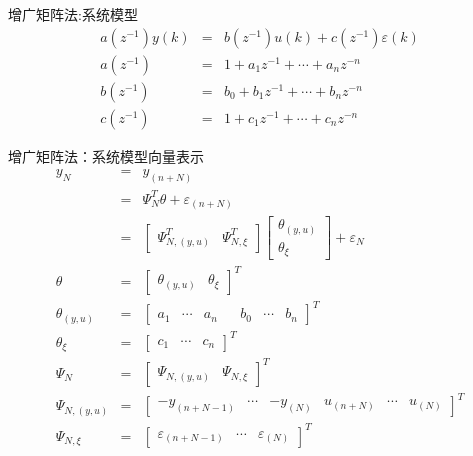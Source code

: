 \begin{frame}{增广矩阵法:系统模型}
\begin{eqnarray*}
a(z^{-1})y(k) &=& b(z^{-1})u(k)+c(z^{-1})\varepsilon(k) \\
a(z^{-1}) &=& 1 + a_1 z^{-1} + \cdots + a_n z^{-n} \\
b(z^{-1}) &=& b_0 + b_1 z^{-1} + \cdots + b_n z^{-n} \\
c(z^{-1}) &=& 1 + c_1 z^{-1} + \cdots + c_n z^{-n} 
\end{eqnarray*}
\end{frame}

\begin{frame}{增广矩阵法：系统模型向量表示}
\begin{eqnarray*}
y_{N} &=& y_{(n+N)} \\
&=& \Psi_N^T\theta +\varepsilon_{(n+N)} \\
&=& \begin{bmatrix} \Psi_{N,(y,u)}^T & \Psi_{N,\xi}^T\end{bmatrix}\begin{bmatrix}\theta_{(y,u)} \\ \theta_\xi \end{bmatrix} + \varepsilon_N \\
\theta &=&\begin{bmatrix}\theta_{(y,u)} & \theta_\xi\end{bmatrix}^T \\
\theta_{(y,u)} &=&\begin{bmatrix}a_1 & \cdots & a_n & & b_0 & \cdots & b_n \end{bmatrix}^T \\
\theta_\xi &=&\begin{bmatrix} c_1 &\cdots & c_n\end{bmatrix}^T \\
\Psi_N &=&\begin{bmatrix} \Psi_{N,(y,u)} &\Psi_{N,\xi} \end{bmatrix}^T \\
\Psi_{N,(y,u)} &=&\begin{bmatrix}-y_{(n+N-1)} & \cdots & -y_{(N)} & u_{(n+N)} &\cdots & u_{(N)} \end{bmatrix}^T \\
\Psi_{N,\xi} &=&\begin{bmatrix} \varepsilon_{(n+N-1)} & \cdots & \varepsilon_{(N)} \end{bmatrix}^T  
\end{eqnarray*}
\end{frame}

